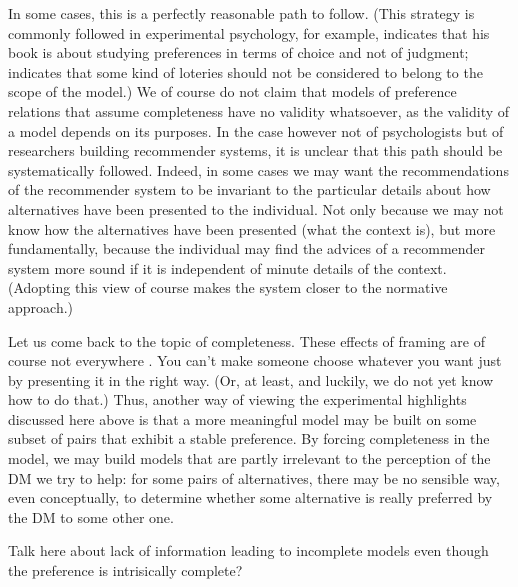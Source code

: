 \documentclass[french, english]{llncs}
\begin{document}
	In some cases, this is a perfectly reasonable path to follow. (This strategy is commonly followed in experimental psychology, for example, \citet{Luce} indicates that his book is about studying preferences in terms of choice and not of judgment; \citet{MacCrimmon} indicates that some kind of loteries should not be considered to belong to the scope of the model.) We of course do not claim that models of preference relations that assume completeness have no validity whatsoever, as the validity of a model depends on its purposes. In the case however not of psychologists but of researchers building recommender systems, it is unclear that this path should be systematically followed. Indeed, in some cases we may want the recommendations of the recommender system to be invariant to the particular details about how alternatives have been presented to the individual. Not only because we may not know how the alternatives have been presented (what the context is), but more fundamentally, because the individual may find the advices of a recommender system more sound if it is independent of minute details of the context. (Adopting this view of course makes the system closer to the normative approach.)
	
	Let us come back to the topic of completeness. These effects of framing are of course not everywhere \citep{slovic}. You can’t make someone choose whatever you want just by presenting it in the right way. (Or, at least, and luckily, we do not yet know how to do that.) Thus, another way of viewing the experimental highlights discussed here above is that a more meaningful model may be built on some subset of pairs that exhibit a stable preference. By forcing completeness in the model, we may build models that are partly irrelevant to the perception of the \ac{DM} we try to help: for some pairs of alternatives, there may be no sensible way, even conceptually, to determine whether some alternative is really preferred by the \ac{DM} to some other one.
	
	Talk here about lack of information leading to incomplete models even though the preference is intrisically complete?
	
\end{document}
